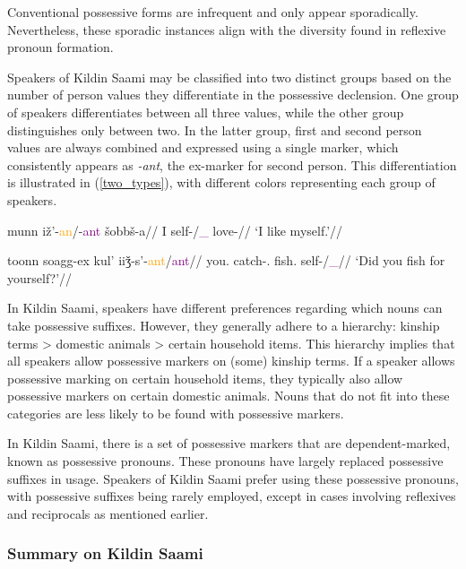 Conventional possessive forms are infrequent and only appear sporadically. Nevertheless, these sporadic instances align with the diversity found in reflexive pronoun formation.

Speakers of Kildin Saami may be classified into two distinct groups based on the number of person values they differentiate in the possessive declension. One group of speakers differentiates between all three values, while the other group distinguishes only between two. In the latter group, first and second person values are always combined and expressed using a single marker, which consistently appears as \textit{-ant}, the ex-marker for second person. This differentiation is illustrated in (\ref{two_types}), with different colors representing each group of speakers.

\pex\label{two_types}
\a\begingl
\gla munn iž'-\textcolor{orange}{an}/-\textcolor{purple}{ant} šobbš-a//
\glb I self-\textcolor{orange}{\Poss{}\First}/\textcolor{purple}{\Poss{}\First\_\Second{}} love-\Npst{}\Fsg//
\glft `I like myself.'//
\endgl

\a\begingl
\gla toonn	soagg-ex	kul'	iiǯ-s'-\textcolor{orange}{ant}/\textcolor{purple}{ant}//
\glb you.\Sg{} catch-\Pst.\Ssg{} fish.\Acc{} self-\textcolor{orange}{\Poss{}\Second{}}/\textcolor{purple}{\Poss{}\First\_\Second{}}//
\glft `Did you fish for yourself?'//
\endgl

\xe

In Kildin Saami, speakers have different preferences regarding which nouns can take possessive suffixes. However, they generally adhere to a hierarchy: kinship terms > domestic animals > certain household items. This hierarchy implies that all speakers allow possessive markers on (some) kinship terms. If a speaker allows possessive marking on certain household items, they typically also allow possessive markers on certain domestic animals. Nouns that do not fit into these categories are less likely to be found with possessive markers.

In Kildin Saami, there is a set of possessive markers that are dependent-marked, known as possessive pronouns. These pronouns have largely replaced possessive suffixes in usage. Speakers of Kildin Saami prefer using these possessive pronouns, with possessive suffixes being rarely employed, except in cases involving reflexives and reciprocals as mentioned earlier.

\subsubsection*{Summary on Kildin Saami}


